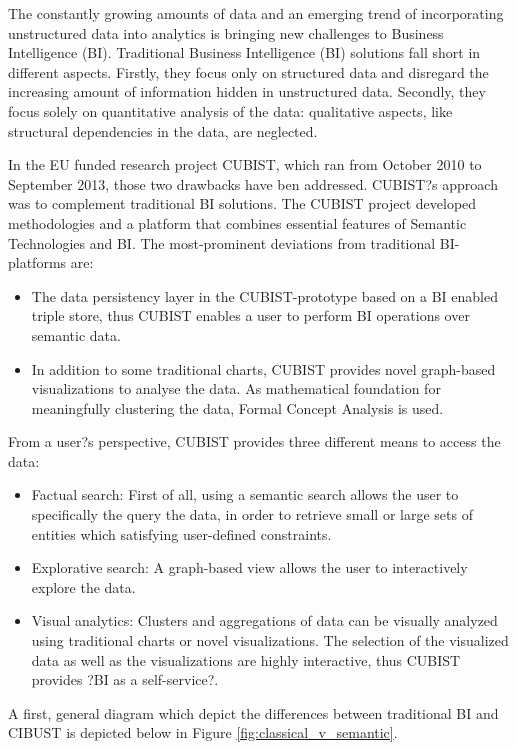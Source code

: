 The constantly growing amounts of data and an emerging trend of incorporating unstructured  data into analytics is bringing new challenges to Business Intelligence (BI). Traditional Business Intelligence (BI) solutions fall short in different aspects. Firstly, they focus only on structured data and disregard the increasing amount of information hidden in unstructured data. Secondly, they focus solely on quantitative analysis of the data: qualitative aspects, like structural dependencies in the data, are neglected. 

In the EU funded research project CUBIST, which ran from October 2010 to September 2013, those two drawbacks have ben addressed. CUBIST?s approach was to complement traditional BI solutions. The CUBIST project developed methodologies and a platform that combines essential features of Semantic Technologies and BI. The most-prominent deviations from traditional BI-platforms are:
\begin{itemize}
\item The data persistency layer in the CUBIST-prototype based on a BI enabled triple store, thus CUBIST enables a user to perform BI operations over semantic data.
\item  In addition to some traditional charts, CUBIST provides novel graph-based visualizations to analyse the data.  As mathematical foundation for meaningfully clustering the data, Formal Concept Analysis is used.
\end{itemize}

From a user?s perspective, CUBIST provides three different means to access the data:
\begin{itemize}
\item Factual search: First of all, using a semantic search allows the user to specifically the query the data, in order to retrieve small or large sets of entities which satisfying user-defined constraints. 
\item Explorative search: A graph-based view allows the user to interactively explore the data.
\item Visual analytics: Clusters and aggregations of data can be visually analyzed using traditional charts or novel visualizations. The selection of the visualized data as well as the visualizations are highly interactive, thus CUBIST provides ?BI as a self-service?.
\end{itemize}

A first, general diagram which depict the differences between traditional BI and CIBUST is depicted below in Figure \ref{fig:classical_v_semantic}.

